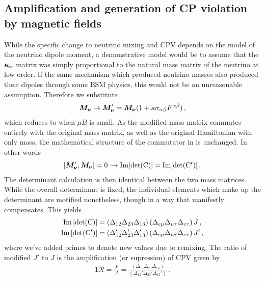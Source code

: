 \subsection{Amplification and generation of CP violation by magnetic fields}
\label{sec:amp}
\noindent While the specific change to neutrino mixing and CPV depends on the model of the neutrino dipole moment, a demonstrative model would be to assume that the $\boldsymbol{\kappa_{\nu}}$ matrix was simply proportional to the natural mass matrix of the neutrino at low order. If the same mechanism which produced neutrino masses also produced their dipoles through some BSM physics, this would not be an unreasonable assumption. Therefore we substitute
\begin{alignat}{1}
	\label{simplek:1} \boldsymbol{M_{\nu}}\rightarrow\boldsymbol{M_{\nu}}'=\boldsymbol{M_{\nu}}(1+\kappa\sigma_{\alpha\beta}F^{\alpha\beta})\,,
\end{alignat}
which reduces to  when $\mu B$ is small. As the modified mass matrix commutes entirely with the original mass matrix, as well as the original Hamiltonian with only mass, the mathematical structure of the commutator in  is unchanged. In other words
\begin{alignat}{1}
	\label{commutes:1} \left[\boldsymbol{M_{\nu}}',\boldsymbol{M_{\nu}}\right]=0\, \rightarrow \rm{Im}[\rm{det}(\boldsymbol{C})] = \rm{Im}[\rm{det}(\boldsymbol{C'})]\,.
\end{alignat}
The determinant calculation is then identical between the two mass matrices. While the overall determinant is fixed, the individual elements which make up the determinant are motified nonetheless, though in a way that manifestly compensates. This yields
\begin{alignat}{1}
	\label{det:0} \rm{Im}\left[\rm{det}(\boldsymbol{C})\right] &= \left(\Delta_{12}\Delta_{23}\Delta_{13}\right)\left(\Delta_{e\mu}\Delta_{\mu\tau}\Delta_{e\tau}\right)J\,,\\
	\label{det:2} \rm{Im}\left[\rm{det}(\boldsymbol{C'})\right] &= \left(\Delta_{12}'\Delta_{23}'\Delta_{13}'\right)\left(\Delta_{e\mu}\Delta_{\mu\tau}\Delta_{e\tau}\right)J'\,,
\end{alignat}
where we've added primes to denote new values due to remixing. The ratio of modified $J'$ to $J$ is the amplification (or supression) of CPV \ar given by
\begin{alignat}{1}
	\label{amp:1} \mathcal{R} = \frac{J'}{J} = \frac{\left(\Delta_{12}\Delta_{23}\Delta_{13}\right)}{\left(\Delta_{12}'\Delta_{23}'\Delta_{13}'\right)}\,.
\end{alignat}
